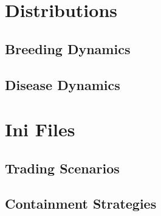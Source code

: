 \appendix
\chapter{Distributions}
\section{Breeding Dynamics}
\section{Disease Dynamics}\label{appendix:diseasesistributions}

\chapter{Ini Files}
\section{Trading Scenarios}
\section{Containment Strategies}\label{chap:iniContainment}
